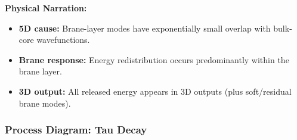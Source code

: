 \textbf{Physical Narration:}
\begin{itemize}[nosep]
    \item \textbf{5D cause:} Brane-layer modes have exponentially small
          overlap with bulk-core wavefunctions.
    \item \textbf{Brane response:} Energy redistribution occurs predominantly
          within the brane layer.
    \item \textbf{3D output:} All released energy appears in 3D outputs
          (plus soft/residual brane modes).
\end{itemize}


\subsubsection{Process Diagram: Tau Decay}

